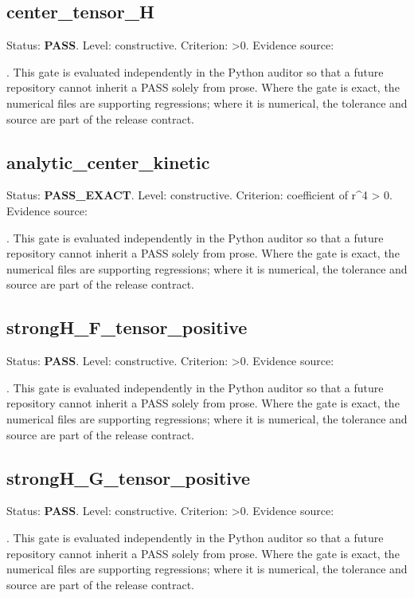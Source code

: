 \documentclass[11pt,a4paper,oneside]{book}
\begin{document}
\subsection{center\_tensor\_H}
Status: \textbf{PASS}. Level: constructive. Criterion: >0. Evidence source:\par\noindent{}. This gate is evaluated independently in the Python auditor so that a future repository cannot inherit a PASS solely from prose. Where the gate is exact, the numerical files are supporting regressions; where it is numerical, the tolerance and source are part of the release contract.\par

\subsection{analytic\_center\_kinetic}
Status: \textbf{PASS\_EXACT}. Level: constructive. Criterion: coefficient of r\textasciicircum{}4 > 0. Evidence source:\par\noindent{}. This gate is evaluated independently in the Python auditor so that a future repository cannot inherit a PASS solely from prose. Where the gate is exact, the numerical files are supporting regressions; where it is numerical, the tolerance and source are part of the release contract.\par

\subsection{strongH\_F\_tensor\_positive}
Status: \textbf{PASS}. Level: constructive. Criterion: >0. Evidence source:\par\noindent{}. This gate is evaluated independently in the Python auditor so that a future repository cannot inherit a PASS solely from prose. Where the gate is exact, the numerical files are supporting regressions; where it is numerical, the tolerance and source are part of the release contract.\par

\subsection{strongH\_G\_tensor\_positive}
Status: \textbf{PASS}. Level: constructive. Criterion: >0. Evidence source:\par\noindent{}. This gate is evaluated independently in the Python auditor so that a future repository cannot inherit a PASS solely from prose. Where the gate is exact, the numerical files are supporting regressions; where it is numerical, the tolerance and source are part of the release contract.\par
\end{document}
